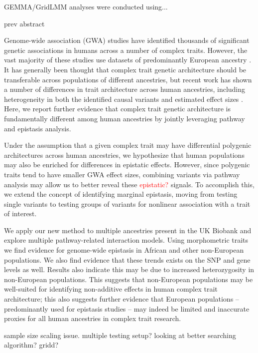 \documentclass[12pt,a4paper]{article}
\newcommand{\red}[1]{\textcolor{red}{#1}}
\begin{document}
GEMMA/GridLMM analyses were conducted using...







prev abstract

Genome-wide association (GWA) studies have identified thousands of significant genetic associations in humans across a number of complex traits. However, the vast majority of these studies use datasets of predominantly European ancestry \citep{Popejoy2016}. It has generally been thought that complex trait genetic architecture should be transferable across populations of different ancestries, but recent work has shown a number of differences in trait architecture across human ancestries, including heterogeneity in both the identified causal variants and estimated effect sizes 
\citep{Martin2017a,Wojcik2019}. Here, we report further evidence that complex trait genetic architecture is fundamentally different among human ancestries by jointly leveraging pathway and epistasis analysis.

Under the assumption that a given complex trait may have differential polygenic architectures across human ancestries, we hypothesize that human populations may also be enriched for differences in epistatic effects. However, since polygenic traits tend to have smaller GWA effect sizes, combining variants via pathway analysis may allow us to better reveal these \red{epistatic?} signals. To accomplish this, we extend the concept of identifying marginal epistasis, moving from testing single variants \citep{Crawford2017a} to testing groups of variants for nonlinear association with a trait of interest.

We apply our new method to multiple ancestries present in the UK Biobank \citep{Sudlow2015} and explore multiple pathway-related interaction models. Using morphometric traits we find evidence for genome-wide epistasis in African and other non-European populations. We also find evidence that these trends exists on the SNP and gene levels as well. Results also indicate this may be due to increased heterozygosity in non-European populations. This suggests that non-European populations may be well-suited for identifying non-additive effects in human complex trait architecture; this also suggests further evidence that European populations -- predominantly used for epistasis studies -- may indeed be limited and inaccurate proxies for all human ancestries in complex trait research.

sample size scaling issue. multiple testing setup? looking at better searching algorithm? gridd?
\end{document}
